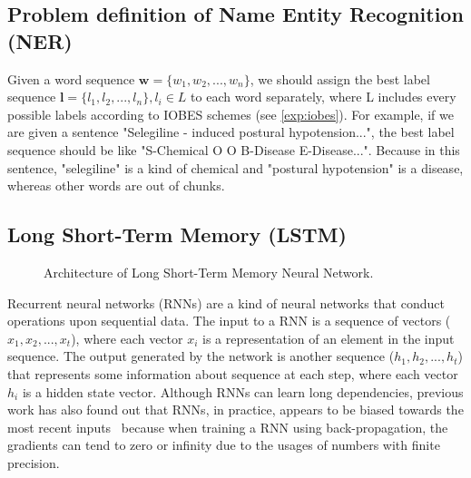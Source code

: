
\subsection{Problem definition of Name Entity Recognition (NER)}

 Given a word sequence $\textbf{w} = \{w_1, w_2, ..., w_n\}$, we should assign the best label sequence $\textbf{l} = \{l_1, l_2, ..., l_n\}, l_i \in L$ to each word separately, where L includes every possible labels according to IOBES schemes (see \ref{exp:iobes}). For example, if we are given a sentence "Selegiline - induced postural hypotension...", the best label sequence should be like "S-Chemical O O B-Disease E-Disease...". Because in this sentence, "selegiline" is a kind of chemical and "postural hypotension" is a disease, whereas other words are out of chunks.

\subsection{Long Short-Term Memory (LSTM)}
\begin{figure}[h]

\caption{Architecture of Long Short-Term Memory Neural Network.}
\label{lstm_arch}
\end{figure}
Recurrent neural networks (RNNs) are a kind of neural networks that conduct operations upon sequential data. The input to a RNN is a sequence of vectors ($x_1, x_2, ..., x_t$), where each vector $x_i$ is a representation of an element in the input sequence. The output generated by the network is another sequence ($h_1, h_2, ..., h_t$) that represents some information about sequence at each step, where each vector $h_i$ is a hidden state vector. Although RNNs can learn long dependencies, previous work has also found out that RNNs, in practice, appears to be biased towards the most recent inputs~\citep{bengio1994} because when training a RNN using back-propagation, the gradients can tend to zero or infinity due to the usages of numbers with finite precision.

